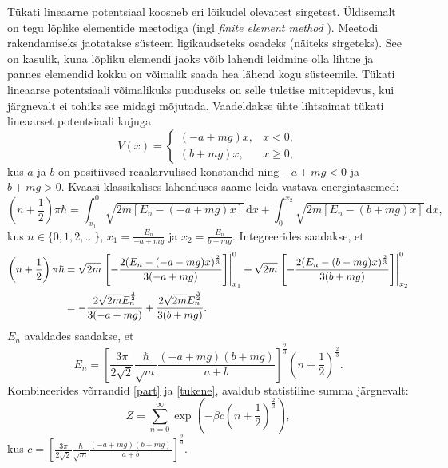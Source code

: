 \documentclass{trkut}%
\begin{document}
Tükati lineaarne potentsiaal koosneb eri lõikudel olevatest sirgetest.
Üldisemalt on tegu lõplike elementide meetodiga (ingl \textit{finite element method }).
Meetodi rakendamiseks jaotatakse süsteem ligikaudseteks osadeks (näiteks sirgeteks).
See on kasulik, kuna lõpliku elemendi jaoks võib lahendi leidmine olla lihtne ja pannes elemendid kokku on võimalik saada hea lähend kogu süsteemile.
Tükati lineaarse potentsiaali võimalikuks puuduseks on selle tuletise mittepidevus, kui järgnevalt ei tohiks see midagi mõjutada.
Vaadeldakse ühte lihtsaimat tükati lineaarset potentsiaali kujuga
\begin{equation} \label{linpot}
    V(x)=\begin{cases}
        (-a+mg)x, & x<0,\\
        (b+mg)x, & x\ge0,
    \end{cases}
\end{equation}
kus $a$ ja $b$ on positiivsed reaalarvulised konstandid ning $-a+mg<0$ ja $b+mg>0$.
Kvaasi-klassikalises lähenduses saame leida vastava energiatasemed:
\begin{equation}
    \left( n+\frac{1}{2}\right)\pi \hbar = \int_{x_1}^{0} \sqrt{2m[E_n-(-a+mg)x]}\, \mathrm{d}x + \int_{0}^{x_2} \sqrt{2m[E_n-(b+mg)x]} \, \mathrm{d}x,
\end{equation}
kus \(n \in \{0, 1, 2, ...\}\), \(x_1=\frac{E_n}{-a+mg}\) ja \(x_2=\frac{E_n}{b+mg}\). Integreerides saadakse, et
\begin{align}
    \left(n+\frac{1}{2}\right)\pi \hbar &= \sqrt{2m}\left.\left[-\frac{2(E_n-(-a-mg)x)^\frac{2}{3}}{3(-a+mg)}\right]\right|^0_{x_1} + \sqrt{2m}\left.\left[-\frac{2(E_n-(b-mg)x)^\frac{2}{3}}{3(b+mg)}\right]\right|^{0}_{x_2} \notag \\
    &= -\frac{2\sqrt{2m}E_n^{\frac{3}{2}}}{3(-a+mg)}+\frac{2\sqrt{2m}E_n^{\frac{3}{2}}}{3(b+mg)}.
\end{align}
$E_n$ avaldades saadakse, et
\begin{equation}
    E_n =\left[\frac{3\pi}{2\sqrt{2}} \frac{\hbar}{\sqrt{m}} \frac{(-a+mg)(b+mg)}{a+b}\right]^{\frac{2}{3}} \left(n+\frac{1}{2}\right)^{\frac{2}{3}} . \label{tukene}
\end{equation}
Kombineerides võrrandid \eqref{part} ja \eqref{tukene}, avaldub statistiline summa järgnevalt:
\begin{equation}
    Z=\sum_{n=0}^{\infty} \exp \left( -\beta c \left(n+\frac{1}{2}\right)^\frac{2}{3} \right),
    \label{linsum}
\end{equation}
kus $c=\left[\frac{3\pi}{2\sqrt{2}} \frac{\hbar}{\sqrt{m}} \frac{(-a+mg)(b+mg)}{a+b}\right]^{\frac{2}{3}}$.
\end{document}
